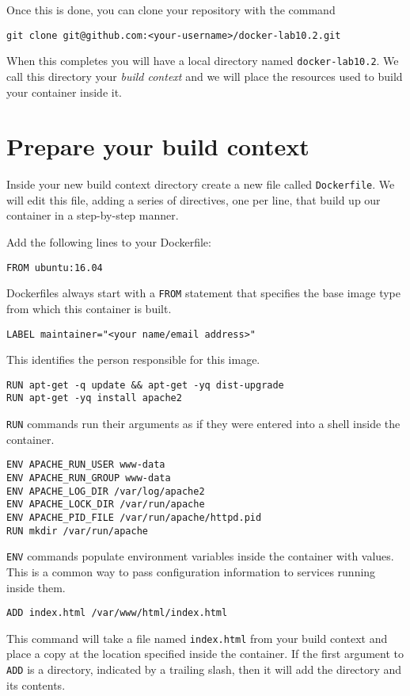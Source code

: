 \documentclass{article}
\begin{document}
Once this is done, you can clone your repository with the command

\texttt{git clone git@github.com:<your-username>/docker-lab10.2.git}

When this completes you will have a local directory named \texttt{docker-lab10.2}. We call this directory your \emph{build context} and we will place the resources used to build your container inside it.

\section{Prepare your build context}
Inside your new build context directory create a new file called \texttt{Dockerfile}. We will edit this file, adding a series of directives, one per line, that build up our container in a step-by-step manner.

Add the following lines to your Dockerfile:

\texttt{FROM ubuntu:16.04}

Dockerfiles always start with a \texttt{FROM} statement that specifies the base image type from which this container is built.

\texttt{LABEL maintainer="<your name/email address>"}

This identifies the person responsible for this image.

\begin{verbatim}
RUN apt-get -q update && apt-get -yq dist-upgrade
RUN apt-get -yq install apache2
\end{verbatim}

\texttt{RUN} commands run their arguments as if they were entered into a shell inside the container.

\begin{verbatim}
ENV APACHE_RUN_USER www-data
ENV APACHE_RUN_GROUP www-data
ENV APACHE_LOG_DIR /var/log/apache2
ENV APACHE_LOCK_DIR /var/run/apache
ENV APACHE_PID_FILE /var/run/apache/httpd.pid
RUN mkdir /var/run/apache
\end{verbatim}

\texttt{ENV} commands populate environment variables inside the container with values. This is a common way to pass configuration information to services running inside them.

\texttt{ADD index.html /var/www/html/index.html }

This command will take a file named \texttt{index.html} from your build context and place a copy at the location specified inside the container. If the first argument to \texttt{ADD} is a directory, indicated by a trailing slash, then it will add the directory and its contents.
\end{document}
